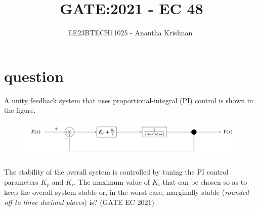 \documentclass[journal,12pt,onecolumn]{IEEEtran}
\theoremstyle{remark}
\begin{document}

\vspace{3cm}

\title{GATE:2021 - EC 48 }
\author{EE23BTECH11025 - Anantha Krishnan $^{}$%
}
\maketitle
\bigskip



\section{question}
A unity feedback system that uses proportional-integral (PI) control is shown in the figure.
 \begin{figure}[!ht]    
    \centering
\graphicspath{ {figs/} }
\includegraphics[width=\columnwidth]{figure_1}
\label{figure:ee25-gate4-graph}
\end{figure}
The stability of the overall system is controlled by tuning the PI control parameters $K_p$ and $K_i$. The maximum value of $K_i$ that can be chosen so as to keep the overall system stable or, in the worst case, marginally stable (\textit{rounded off to three decimal places}) is?
\hfill{(GATE EC 2021)}\\
 
\end{document}
